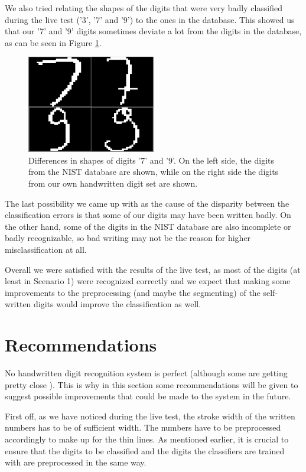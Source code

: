 \documentclass[11pt,twoside,a4paper]{article}
\begin{document}
We also tried relating the shapes of the digits that were very badly classified during the live test ('3', '7' and '9') to the ones in the database. This showed us that our '7' and '9' digits sometimes deviate a lot from the digits in the database, as can be seen in Figure \ref{img:nistvslive}.\newline
\begin{figure}[h]
  \centering
  \captionsetup{justification=centering}
  \includegraphics[width=0.5\textwidth]{NISTvsLIVE_7.png}
  \caption{Differences in shapes of digits '7' and '9'. On the left side, the digits from the NIST database are shown, while on the right side the digits from our own handwritten digit set are shown.}
  \label{img:nistvslive}
\end{figure}

The last possibility we came up with as the cause of the disparity between the classification errors is that some of our digits may have been written badly. On the other hand, some of the digits in the NIST database are also incomplete or badly recognizable, so bad writing may not be the reason for higher misclassification at all.

Overall we were satisfied with the results of the live test, as most of the digits (at least in Scenario 1) were recognized correctly and we expect that making some improvements to the preprocessing (and maybe the segmenting) of the self-written digits would improve the classification as well.

\section{Recommendations}
No handwritten digit recognition system is perfect (although some are getting pretty close \cite{mnist}). This is why in this section some recommendations will be given to suggest possible improvements that could be made to the system in the future.

First off, as we have noticed during the live test, the stroke width of the written numbers has to be of sufficient width. The numbers have to be preprocessed accordingly to make up for the thin lines. As mentioned earlier, it is crucial to ensure that the digits to be classified and the digits the classifiers are trained with are preprocessed in the same way.
\end{document}
